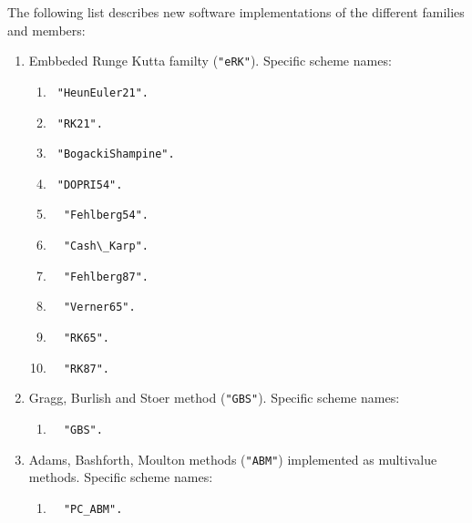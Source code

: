 The following list describes new software implementations of the different families and members:  
 \begin{enumerate} 
    \item   Embbeded Runge Kutta familty (\verb|"eRK"|). Specific scheme names:  
         \begin{enumerate} 
         \setlength\itemsep{0cm}
          \item \verb| "HeunEuler21".  |
          \item \verb| "RK21".  |
          \item \verb| "BogackiShampine".  |
          \item \verb| "DOPRI54".      |
          \item \verb|  "Fehlberg54".  |
          \item \verb|  "Cash\_Karp".   |
          \item \verb|  "Fehlberg87".  |
          \item \verb|  "Verner65".    |
          \item \verb|  "RK65".        |
          \item \verb|  "RK87".        |
        \end{enumerate}  
    \item  Gragg,  Burlish and Stoer method (\verb|"GBS"|). Specific scheme names: 
               \begin{enumerate} 
                  \item  \verb|  "GBS". |  
               \end{enumerate}     
    \item  Adams, Bashforth, Moulton methods (\verb|"ABM"|) implemented as multivalue methods. Specific scheme names: 
                \begin{enumerate} 
                   \item  \verb|  "PC_ABM". |
                 \end{enumerate} 
  \end{enumerate} 



